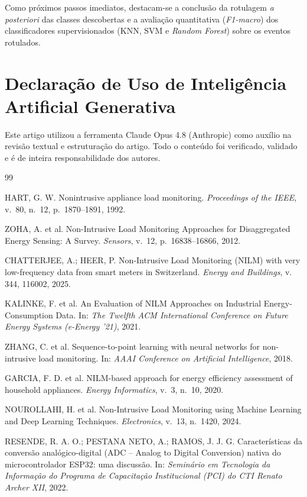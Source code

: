 \documentclass[12pt]{article}
\begin{document}
Como pr\'oximos passos imediatos, destacam-se a conclus\~ao da rotulagem
\textit{a posteriori} das classes descobertas e a avalia\c{c}\~ao quantitativa
(\textit{F1-macro}) dos classificadores supervisionados (KNN, SVM e
\textit{Random Forest}) sobre os eventos rotulados.


\section*{Declara\c{c}\~ao de Uso de Intelig\^encia Artificial Generativa}
Este artigo utilizou a ferramenta Claude Opus 4.8 (Anthropic) como
aux\'ilio na revis\~ao textual e estrutura\c{c}\~ao do artigo.
Todo o conte\'udo foi verificado, validado e \'e de inteira responsabilidade
dos autores.

\begin{thebibliography}{99}

 HART, G. W. Nonintrusive appliance load monitoring.
  \textit{Proceedings of the IEEE}, v.~80, n.~12, p.~1870--1891, 1992.

 ZOHA, A. et al. Non-Intrusive Load Monitoring Approaches for
  Disaggregated Energy Sensing: A Survey. \textit{Sensors}, v.~12,
  p.~16838--16866, 2012.

 CHATTERJEE, A.; HEER, P. Non-Intrusive Load Monitoring (NILM)
  with very low-frequency data from smart meters in Switzerland.
  \textit{Energy and Buildings}, v. 344, 116002, 2025.

 KALINKE, F. et al. An Evaluation of NILM Approaches on
  Industrial Energy-Consumption Data. In: \textit{The Twelfth ACM
  International Conference on Future Energy Systems (e-Energy '21)}, 2021.

 ZHANG, C. et al. Sequence-to-point learning with neural
  networks for non-intrusive load monitoring. In: \textit{AAAI Conference on
  Artificial Intelligence}, 2018.

 GARCIA, F. D. et al. NILM-based approach for energy efficiency
  assessment of household appliances. \textit{Energy Informatics}, v.~3,
  n.~10, 2020.

 NOUROLLAHI, H. et al. Non-Intrusive Load Monitoring using
  Machine Learning and Deep Learning Techniques. \textit{Electronics}, v.~13,
  n.~1420, 2024.

 RESENDE, R. A. O.; PESTANA NETO, A.; RAMOS, J. J. G.
  Caracter\'isticas da convers\~ao anal\'ogico-digital (ADC -- Analog to
  Digital Conversion) nativa do microcontrolador ESP32: uma discuss\~ao. In:
  \textit{Semin\'ario em Tecnologia da Informa\c{c}\~ao do Programa de
  Capacita\c{c}\~ao Institucional (PCI) do CTI Renato Archer XII}, 2022.

\end{thebibliography}
\end{document}
